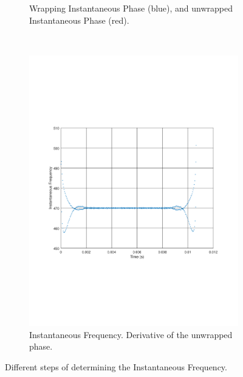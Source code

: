 \begin{figure}
\begin{subfigure}[t]{.5\textwidth}
		\caption{Wrapping Instantaneous Phase (blue), and unwrapped Instantaneous Phase (red).}
		\label{fig:sub2}
	\end{subfigure} \\
	\begin{subfigure}[t]{.5\textwidth}
		\centering
		\includegraphics[width=.9\linewidth, clip, trim={2cm 7cm 2cm 7cm}]{gfx/Modelling/IFIF.pdf}
		\caption{Instantaneous Frequency. Derivative of the unwrapped phase.}
		\label{fig:sub3}
	\end{subfigure} 
	\caption{Different steps of determining the Instantaneous Frequency.}
	\label{fig:IFexplained}
\end{figure}

